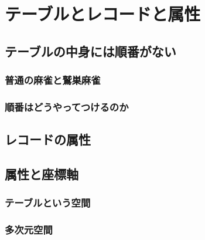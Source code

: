 \chapter{テーブルとレコードと属性}

\section{テーブルの中身には順番がない}

\subsection{普通の麻雀と鷲巣麻雀}

\subsection{順番はどうやってつけるのか}

\section{レコードの属性}

\section{属性と座標軸}

\subsection{テーブルという空間}

\subsection{多次元空間}